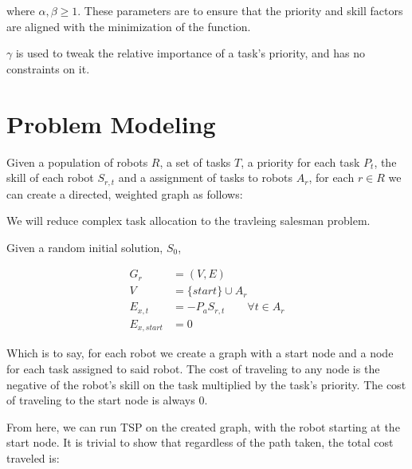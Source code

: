 \documentclass[a4paper]{article}
\begin{document}
where $\alpha, \beta \geq 1$. These parameters are to ensure that the priority and skill factors are aligned with the minimization of the function. 

$\gamma$ is used to tweak the relative importance of a task's priority, and has no constraints on it.


\section{Problem Modeling}


Given a population of robots $R$, a set of tasks $T$, a priority for each task $P_t$, the
skill of each robot $S_{r,t}$ and a assignment of tasks to robots $A_r$, for each $r \in R$
we can create a directed, weighted graph as follows:

We will reduce complex task allocation to the travleing salesman problem.

Given a random initial solution, $S_0$,

\begin{align*}
	G_r &= (V, E) \\
	V &= \{ start \} \cup A_r \\
	E_{x, t} &= -P_a S_{r,t} \qquad \forall t \in A_r \\
	E_{x, start} &= 0
\end{align*}

Which is to say, for each robot we create a graph with a start node and a node for each task assigned to said robot. The cost of traveling to any node is the negative of the robot's skill on the task multiplied by the task's priority. The cost of traveling to the start node is always 0.

From here, we can run TSP on the created graph, with the robot starting at the start node. It is trivial to show that regardless of the path taken, the total cost traveled is:
\end{document}
